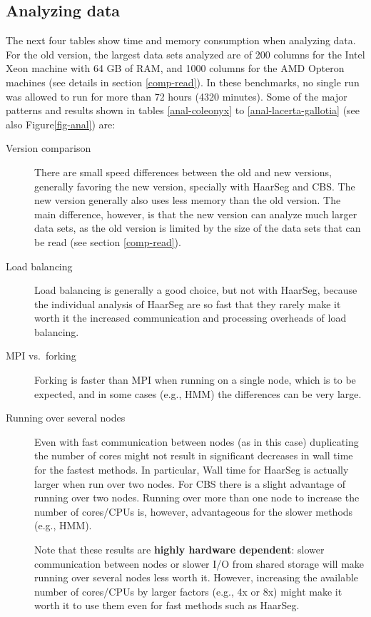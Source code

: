 \documentclass[a4paper,11pt]{article}
\begin{document}
\clearpage
\subsection{Analyzing data}\label{comp-anal}
The next four tables show time and memory consumption when analyzing
data. For the old version, the largest data sets analyzed are of 200
columns for the Intel Xeon machine with 64 GB of RAM, and 1000 columns for
the AMD Opteron machines (see details in section \ref{comp-read}). In
these benchmarks, no single run was allowed to run for more than 72 hours
(4320 minutes). Some of the major patterns and results shown in tables
\ref{anal-coleonyx} to \ref{anal-lacerta-gallotia} (see also
Figure\ref{fig-anal}) are:

\begin{description}

\item[Version comparison] There are small speed differences between the
  old and new versions, generally favoring the new version, specially with
  HaarSeg and CBS. The new version generally also uses less memory than
  the old version. The main difference, however, is that the new version
  can analyze much larger data sets, as the old version is limited by the
  size of the data sets that can be read (see section \ref{comp-read}).

\item[Load balancing] Load balancing is generally a good choice, but not
  with HaarSeg, because the individual analysis of HaarSeg are so fast
  that they rarely make it worth it the increased communication and
  processing overheads of load balancing.

\item[MPI vs.\ forking] Forking is faster than MPI when running on a
  single node, which is to be expected, and in some cases (e.g., HMM) the
  differences can be very large.

\item[Running over several nodes] Even with fast communication between
  nodes (as in this case) duplicating the number of cores might not result
  in significant decreases in wall time for the fastest methods. In
  particular, Wall time for HaarSeg is actually larger when run over two
  nodes. For CBS there is a slight advantage of running over two
  nodes. Running over more than one node to increase the number of
  cores/CPUs is, however, advantageous for the slower methods (e.g.,
  HMM).  
  
  Note that these results are \textbf{highly hardware dependent}: slower
  communication between nodes or slower I/O from shared storage will make
  running over several nodes less worth it. However, increasing the
  available number of cores/CPUs by larger factors (e.g., 4x or 8x) might
  make it worth it to use them even for fast methods such as HaarSeg.

\end{description}
\end{document}
